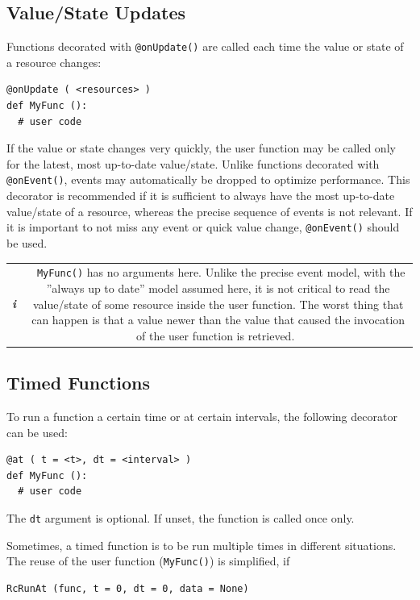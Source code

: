 \documentclass[12pt,english,parskip=half]{scrreprt}
\newcommand{\infobox}[1]{
  \hfill
  \setlength\arrayrulewidth{1pt}
  \begin{tabular}[t]{c|c|}
    \parbox{1.8em}{\hfill\textit{\Huge\textbf{i}\,}}
    &
    \,\parbox{0.89\linewidth}{\setlength{\parskip}{0.5em}#1}\,
  \end{tabular}
  \par
}
\begin{document}
\subsection{Value/State Updates}

Functions decorated with \texttt{@onUpdate()} are called each time
the value or state of a resource changes:

\begin{lstlisting}
@onUpdate ( <resources> )
def MyFunc ():
  # user code
\end{lstlisting}

If the value or state changes very quickly, the user function may be called only for the
latest, most up-to-date value/state. Unlike functions decorated with
\texttt{@onEvent()}, events may automatically be dropped to optimize performance.
This decorator is recommended if it is sufficient to always have the most up-to-date
value/state of a resource, whereas the precise sequence of events is not relevant.
If it is important to not miss any event or quick value change, \texttt{@onEvent()}
should be used.

\infobox{
  \texttt{MyFunc()} has no arguments here. Unlike the precise event model, with the
  ''always up to date'' model assumed here, it is not critical to read the value/state
  of some resource inside the user function. The worst thing that can happen is that
  a value newer than the value that caused the invocation of the user function is
  retrieved.
}



\subsection{Timed Functions}

To run a function a certain time or at certain intervals, the following
decorator can be used:

\begin{lstlisting}
@at ( t = <t>, dt = <interval> )
def MyFunc ():
  # user code
\end{lstlisting}

The \texttt{dt} argument is optional. If unset, the function is called once only.

Sometimes, a timed function is to be run multiple times in different situations.
The reuse of the user function (\texttt{MyFunc()}) is simplified, if

\begin{lstlisting}
RcRunAt (func, t = 0, dt = 0, data = None)
\end{lstlisting}
\end{document}
